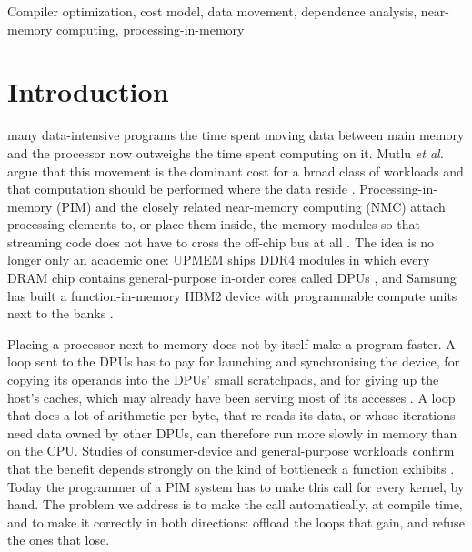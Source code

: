 \documentclass{ieeeaccess}
\begin{document}
\begin{keywords}
Compiler optimization, cost model, data movement, dependence analysis, near-memory computing, processing-in-memory
\end{keywords}

\titlepgskip=-21pt

\maketitle

\section{Introduction}
\label{sec:introduction}

 many data-intensive programs the time spent moving data between main memory and the processor now outweighs the time spent computing on it. Mutlu \emph{et al.} argue that this movement is the dominant cost for a broad class of workloads and that computation should be performed where the data reside \cite{mutlu2019where}. Processing-in-memory (PIM) and the closely related near-memory computing (NMC) attach processing elements to, or place them inside, the memory modules so that streaming code does not have to cross the off-chip bus at all \cite{singh2019nmc, mutlu2020primer}. The idea is no longer only an academic one: UPMEM ships DDR4 modules in which every DRAM chip contains general-purpose in-order cores called DPUs \cite{devaux2019upmem}, and Samsung has built a function-in-memory HBM2 device with programmable compute units next to the banks \cite{kwon2021fimdram}.

Placing a processor next to memory does not by itself make a program faster. A loop sent to the DPUs has to pay for launching and synchronising the device, for copying its operands into the DPUs' small scratchpads, and for giving up the host's caches, which may already have been serving most of its accesses \cite{ghose2019workload}. A loop that does a lot of arithmetic per byte, that re-reads its data, or whose iterations need data owned by other DPUs, can therefore run more slowly in memory than on the CPU. Studies of consumer-device and general-purpose workloads confirm that the benefit depends strongly on the kind of bottleneck a function exhibits \cite{boroumand2018google, oliveira2022methodologies}. Today the programmer of a PIM system has to make this call for every kernel, by hand. The problem we address is to make the call automatically, at compile time, and to make it correctly in both directions: offload the loops that gain, and refuse the ones that lose.
\end{document}
